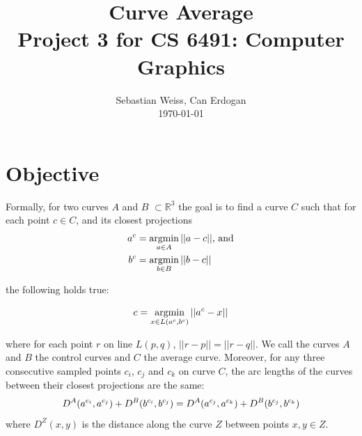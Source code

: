 \documentclass[journal, letterpaper]{IEEEtran}
\begin{document}
\title{Curve Average \\
	{\large Project 3 for CS 6491: Computer Graphics}}
\author{Sebastian Weiss, Can Erdogan \\ \today}

\maketitle


\section{Objective}
Formally, for two curves $A$ and $B$ $\subset\mathbb{R}^3$ 
the goal is to find a curve $C$ such that for each point $c \in C$, and its closest projections
\begin{align}
a^c &= \operatornamewithlimits{argmin}\limits_{a \in A} ||a-c|| \text{, and} \\
b^c &= \operatornamewithlimits{argmin}\limits_{b \in B} ||b-c||
\end{align}

\noindent the following holds true:

\begin{equation}
 c = \operatornamewithlimits{argmin}\limits_{x \in L(a^c, b^c)} ||a^c-x||
\end{equation}

\noindent where for each point $r$ on line $L(p,q)$, $||r-p|| = ||r-q||$. We call the curves $A$ and $B$ the control curves and $C$ the average curve.
Moreover, for any three consecutive sampled points $c_i$, $c_j$ and $c_k$ on curve $C$, the arc lengths
of the curves between their closest projections are the same:
\begin{equation}
\small
 D^A(a^{c_i},a^{c_j}) + D^B(b^{c_i},b^{c_j}) = D^A(a^{c_j},a^{c_k}) + D^B(b^{c_j},b^{c_k})
\end{equation}
\noindent where $D^Z(x,y)$ is the distance along the curve $Z$ between points $x,y \in Z$.
\end{document}

